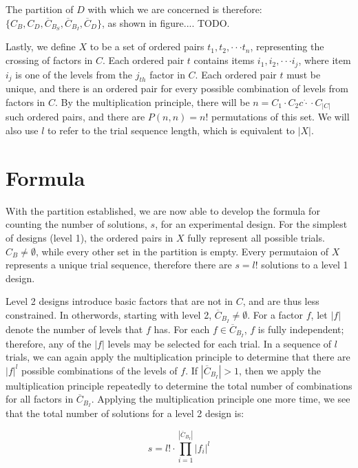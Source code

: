 The partition of $D$ with which we are concerned is therefore: $\{C_B, C_D, \overline{C}_{B_S}, \overline{C}_{B_I}, \overline{C}_D\}$, as shown in figure.... TODO.


Lastly, we define $X$ to be a set of ordered pairs $t_1, t_2, \cdot\cdot\cdot t_n$, representing the crossing of factors in $C$. Each ordered pair $t$ contains items $i_1, i_2, \cdot\cdot\cdot i_j$, where item $i_j$ is one of the levels from the $j_{th}$ factor in $C$. Each ordered pair $t$ must be unique, and there is an ordered pair for every possible combination of levels from factors in $C$. By the multiplication principle, there will be $n = C_1 \cdot C_2 c\dot\cdot\cdot C_{|C|}$ such ordered pairs, and there are $P(n, n) = n!$ permutations of this set. We will also use $l$ to refer to the trial sequence length, which is equivalent to $|X|$.


\section{Formula}

With the partition established, we are now able to develop the formula for counting the number of solutions, $s$, for an experimental design. For the simplest of designs (level 1), the ordered pairs in $X$ fully represent all possible trials. $C_B \neq \emptyset$, while every other set in the partition is empty. Every permutaion of $X$ represents a unique trial sequence, therefore there are $s = l!$ solutions to a level 1 design.

Level 2 designs introduce basic factors that are not in $C$, and are thus less constrained. In otherwords, starting with level 2, $\overline{C}_{B_I} \neq \emptyset$. For a factor $f$, let $|f|$ denote the number of levels that $f$ has. For each $f \in \overline{C}_{B_I}$, $f$ is fully independent; therefore, any of the $|f|$ levels may be selected for each trial. In a sequence of $l$ trials, we can again apply the multiplication principle to determine that there are $|f|^l$ possible combinations of the levels of $f$. If $|\overline{C}_{B_I}| > 1$, then we apply the multiplication principle repeatedly to determine the total number of combinations for all factors in $\overline{C}_{B_I}$. Applying the multiplication principle one more time, we see that the total number of solutions for a level 2 design is:

\[
s = l! \cdot \prod_{i=1}^{|\overline{C}_{B_I}|} |f_i|^l
\]

